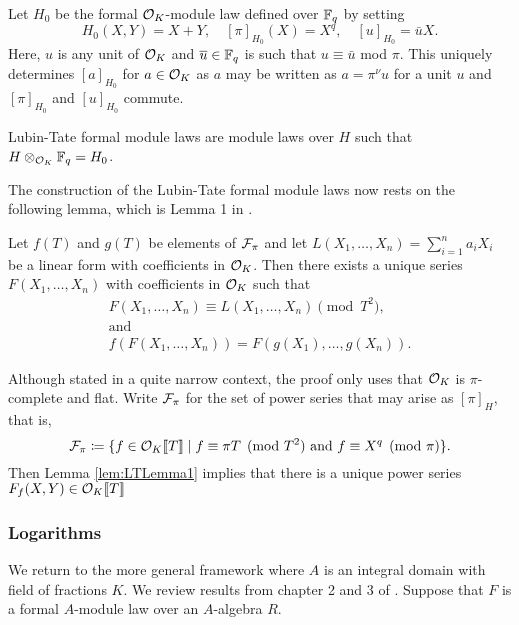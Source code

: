 Let $H_0$ be the formal $\mathcal{O}_K$-module law defined over $\mathbb{F}_q$ by setting
\begin{equation*}
  H_0(X,Y) = X + Y, \quad [\pi]_{H_0}(X) = X^q, \quad [u]_{H_0}= \bar u X.
\end{equation*}
Here, $u$ is any unit of $\mathcal{O}_K$ and $\overline u \in \mathbb{F}_q$ is such that 
$u \equiv \bar u$ mod $\pi$. This uniquely determines $[a]_{H_0}$ 
for $a \in \mathcal{O}_K$ as $a$ may be written as $a = \pi^{\nu} u$ for a unit $u$ and
$[\pi]_{H_0}$ and $[u]_{H_0}$ commute. 

Lubin-Tate formal module laws are module laws over $H$ such that 
$H \otimes_{\mathcal{O}_K} \mathbb{F}_q = H_0$. 

The construction of the Lubin-Tate formal module laws now rests on the following 
lemma, which is Lemma 1 in \cite{LubinTateFormalMult}.
\begin{lem}\label{lem:LTLemma1}
  Let $f(T)$ and $g(T)$ be elements of $\mathcal{F}_\pi$ and let 
  $L(X_1, \dots, X_n) = \sum_{i=1}^n a_i X_i$ be a linear form with coefficients in 
  $\mathcal{O}_K$. Then there exists a unique series $F(X_1, \dots, X_n)$ with coefficients 
  in $\mathcal{O}_K$ such that 
  \begin{gather*}
    F(X_1, \dots, X_n) \equiv L(X_1, \dots, X_n) \pmod {T^2}, \\ \text{and} \\
    f(F(X_1, \dots, X_n)) = F(g(X_1), \dots, g(X_n)).
  \end{gather*}
\end{lem}
Although stated in a quite narrow context, the proof only uses that $\mathcal{O}_K$ is 
$\pi$-complete and flat.
Write $\mathcal{F}_\pi$ for the set of power series that may arise as $[\pi]_H$, that is,
\begin{equation*}
  \mathcal{F}_\pi \coloneqq \{f \in \mathcal{O}_K \llbracket T \rrbracket \mid f \equiv \pi T \pmod {T^2}
    \text{ and } f \equiv X^q \pmod \pi\}. 
\end{equation*}
Then Lemma \ref{lem:LTLemma1} implies that there is a unique power series 
$F_f(X,Y) \in \mathcal{O}_K\llbracket T \rrbracket$ 


\subsubsection{Logarithms} %
\label{ssub:Logarithms}
We return to the more general framework where $A$ is an integral domain with 
field of fractions $K$. We review results from chapter
2 and 3 of \cite{hopkins1994equivariant}. 
Suppose that $F$ is a formal $A$-module law over an $A$-algebra $R$. 

